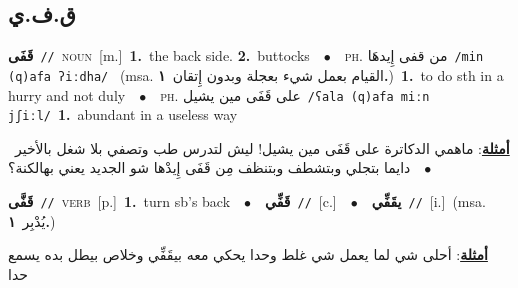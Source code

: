 \documentclass[10pt,a4paper,twoside]{article} %
\begin{document}
\begin{multicols}{2}
\vspace{-3mm}
\subsection*{\color{blue}\foreignlanguage{arabic}{ق.ف.ي}\color{blue}{}} 

{\setlength\topsep{0pt}\textbf{\foreignlanguage{arabic}{قَفَى}}\ {\color{gray}\texttt{//}\color{black}}\ \textsc{noun}\ [m.]\ \textbf{1.}~the back side.  \textbf{2.}~buttocks\ \ $\bullet$\ \ \textsc{ph.} \color{gray} \foreignlanguage{arabic}{من قفى إِيدهَا}\color{black}\ {\color{gray}\texttt{/{\sffamily min (q)afa ʔiːdha}/}\color{black}}\ \color{gray} (msa. \foreignlanguage{arabic}{القيام بعمل شيء بعجلة وبدون إِتقان}~\foreignlanguage{arabic}{\textbf{١.}})\color{black}\ \textbf{1.}~to do sth in a hurry and not duly\ \ $\bullet$\ \ \textsc{ph.} \color{gray} \foreignlanguage{arabic}{على قَفَى مين يشيل}\color{black}\ {\color{gray}\texttt{/{\sffamily ʕala (q)afa miːn jʃiːl}/}\color{black}}\ \textbf{1.}~abundant in a useless way\  \begin{flushright}\color{gray}\foreignlanguage{arabic}{\textbf{\underline{\foreignlanguage{arabic}{أمثلة}}}: ماهمي الدكاترة على قَفَى مين يشيل! ليش لتدرس طب وتصفي بلا شغل بالأخير\ $\bullet$\ \  دايما بتجلي وبتشطف وبتنظف مِن قَفَى إِيدْها شو الجديد يعني بهالكنة؟}\end{flushright}\color{black}} \vspace{2mm}

{\setlength\topsep{0pt}\textbf{\foreignlanguage{arabic}{قَفَّى}}\ {\color{gray}\texttt{//}\color{black}}\ \textsc{verb}\ [p.]\ \textbf{1.}~turn sb's back\ \ $\bullet$\ \ \setlength\topsep{0pt}\textbf{\foreignlanguage{arabic}{قَفِّي}}\ {\color{gray}\texttt{//}\color{black}}\ [c.]\ \ $\bullet$\ \ \setlength\topsep{0pt}\textbf{\foreignlanguage{arabic}{يقَفِّي}}\ {\color{gray}\texttt{//}\color{black}}\ [i.]\ \color{gray}(msa. \foreignlanguage{arabic}{يُدْبِر}~\foreignlanguage{arabic}{\textbf{١.}})\color{black}\  \begin{flushright}\color{gray}\foreignlanguage{arabic}{\textbf{\underline{\foreignlanguage{arabic}{أمثلة}}}: أحلى شي لما يعمل شي غلط وحدا يحكي معه بيقَفِّي وخلاص بيطل بده يسمع حدا}\end{flushright}\color{black}} \vspace{2mm}


\end{multicols}
\end{document}
